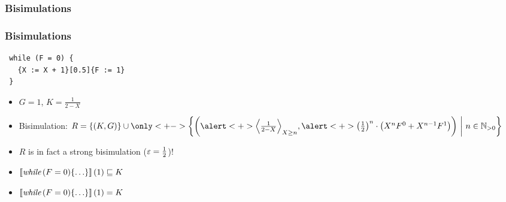\begin{frame}
	\frametitle{Bisimulations}
\end{frame}

\begin{frame}[fragile]
	\frametitle{Bisimulations}
	\begin{lstlisting}
 while (F = 0) {
   {X := X + 1}[0.5]{F := 1}
 }
	\end{lstlisting}
	\begin{itemize}[<+->]
		\itemspacing{10pt}
		\item $ G = 1$, $ K = \frac{1}{2 - X} $
		\item Bisimulation: $ R = \l\{ \pair{K, G}  \r\} \cup
			\only<+->{
				\l\{ \pair{
					\alert<+>{ \res{\frac{1}{2 - X}}{X \geq n} },
					\alert<+>{ \half^n \cdot \l( X^n F^0 + X^{n-1} F^1 \r) } } \ 
					\middle| \ n \in \N_{>0} \r\} 
			} $
		\item $R$ is in fact a strong bisimulation ($\varepsilon = \frac{1}{2}$)!
		\item $ \left\llbracket \textit{while}\,(F = 0) \{\ldots\} \right\rrbracket(1) \sqsubseteq K $
		\item $ \left\llbracket \textit{while}\,(F = 0) \{\ldots\} \right\rrbracket(1) = K $
	\end{itemize}
\end{frame}
